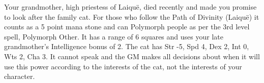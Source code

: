 \begin{multicols}{2}
\begin{list}{\addtocounter{list}{1}\textbf{:}}{\raggedleft}
{  Your grandmother, high priestess of Laiqu\"{e}, died recently and made you promise to look after the family cat.
  For those who follow the Path of Divinity (Laiqu\"{e}) it counts as a 5 point mana stone and can Polymorph people as per the 3rd level spell, Polymorph Other.
  It has a range of 6 squares and uses your late grandmother's Intelligence bonus of 2.
  The cat has Str -5, Spd 4, Dex 2, Int 0, Wts 2, Cha 3.
  It cannot speak and the GM makes all decisions about when it will use this power according to the interests of the cat, not the interests of your character.
  }
\end{list}
\end{multicols}
